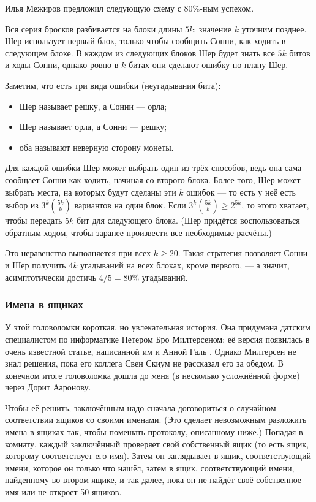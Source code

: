 \begin{addedbytheeditors}
Илья Межиров предложил следующую схему с 80\%-ным успехом.

Вся серия бросков разбивается на блоки длины $5k$; значение $k$ уточним позднее.
Шер использует первый блок, только чтобы сообщить Сонни, как ходить в следующем блоке.
В каждом из следующих блоков Шер будет знать все $5k$ битов и ходы Сонни,
однако ровно в $k$ битах они сделают ошибку по плану Шер. 

Заметим, что есть три вида ошибки (неугадывания бита): 
\begin{itemize}
\item Шер называет решку, а Сонни --- орла;
\item Шер называет орла, а Сонни --- решку;
\item оба называют неверную сторону монеты.
\end{itemize}
Для каждой ошибки Шер может выбрать один из трёх способов,
ведь она сама сообщает Сонни как ходить, начиная со второго блока.
Более того, Шер может выбрать места, на которых будут сделаны эти $k$ ошибок --- то есть
у неё есть выбор из $3^k \binom{5k}{k}$ вариантов на один блок.
Если $3^k \binom{5k}{k}\ge 2^{5k}$, то этого хватает, чтобы передать $5k$ бит для следующего блока.
(Шер придётся воспользоваться обратным ходом, чтобы заранее произвести все необходимые расчёты.)

Это неравенство выполняется при всех $k\ge 20$.
Такая стратегия позволяет Сонни и Шер получить $4k$ угадываний на всех блоках, кроме первого, --- а значит, асимптотически достичь $4/5=80\%$ угадываний.
\pr
\end{addedbytheeditors}


\subsubsection*{Имена в ящиках}

У этой головоломки короткая, но увлекательная история.
Она придумана датским специалистом по информатике Петером Бро Милтерсеном;
её версия появилась в очень известной статье, написанной им и Анной Галь \cite{21}.
Однако Милтерсен не знал  решения, пока его коллега Свен Скиум не рассказал его за обедом.
В конечном итоге головоломка дошла до меня (в несколько усложнённой форме) через Дорит Ааронову.

Чтобы её решить, заключённым надо сначала договориться о случайном соответствии ящиков со своими именами.
(Это сделает невозможным разложить имена в ящиках так, чтобы помешать протоколу, описанному ниже.)
Попадая в комнату, каждый заключённый проверяет свой собственный ящик (то есть ящик, которому соответствует его имя).
Затем он заглядывает в ящик, соответствующий имени, которое он только что нашёл,
затем в ящик, соответствующий имени, найденному во втором ящике, и так далее, пока он не найдёт своё собственное имя или не откроет 50 ящиков.


